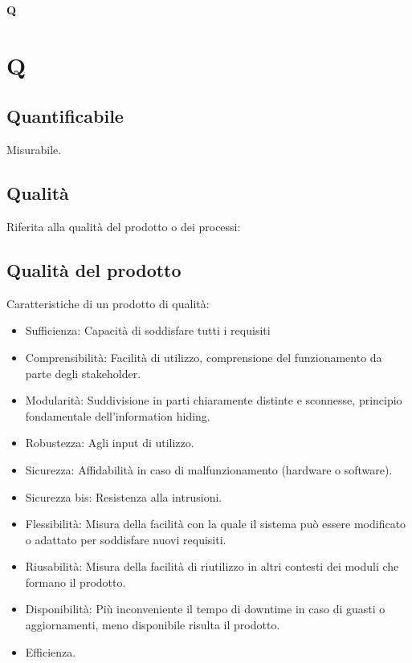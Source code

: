 	{\Huge{\textbf{Q}}} \\
	\section{Q}
	
	\subsection{Quantificabile}
	\label{sec:quantificabile}
	Misurabile.
	
	\subsection{Qualità} 
	\label{sec:qualita}
	Riferita alla qualità del prodotto o dei processi:
	\subsection{Qualità del prodotto}
	Caratteristiche di un prodotto di qualità:
	\begin{itemize}  
	\item Sufficienza: Capacità di soddisfare tutti i requisiti
	\item Comprensibilità: Facilità di utilizzo, comprensione del funzionamento da parte degli stakeholder.
	\item Modularità: Suddivisione in parti chiaramente distinte e sconnesse, principio fondamentale dell'information hiding. 
	\item Robustezza: Agli input di utilizzo.
	\item Sicurezza: Affidabilità in caso di malfunzionamento (hardware o software).
	\item Sicurezza bis: Resistenza alla intrusioni. 
	\item Flessibilità: Misura della facilità con la quale il sistema può essere modificato o adattato per soddisfare nuovi requisiti.
	\item Riusabilità: Misura della facilità di riutilizzo in altri contesti dei moduli che formano il prodotto.
	\item Disponibilità: Più inconveniente il tempo di downtime in caso di guasti o aggiornamenti, meno disponibile risulta il prodotto.	
	\item Efficienza.
	\end{itemize}
